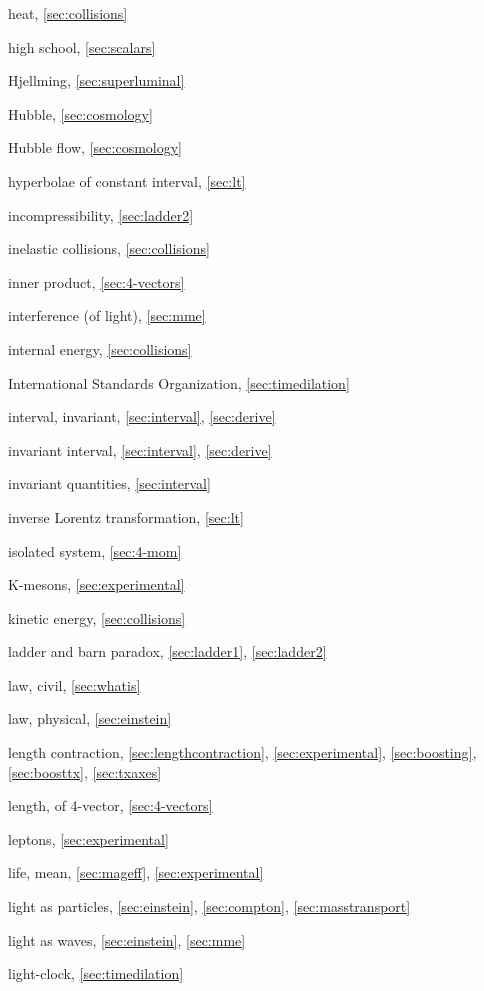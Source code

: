 \begin{theindex}
\item heat, \ref{sec:collisions}
\item high school, \ref{sec:scalars}
\item Hjellming, \ref{sec:superluminal}
\item Hubble, \ref{sec:cosmology}
\item Hubble flow, \ref{sec:cosmology}
\item hyperbolae of constant interval, \ref{sec:lt}
\item incompressibility, \ref{sec:ladder2}
\item inelastic collisions, \ref{sec:collisions}
\item inner product, \ref{sec:4-vectors}
\item interference (of light), \ref{sec:mme}
\item internal energy, \ref{sec:collisions}
\item International Standards Organization, \ref{sec:timedilation}
\item interval, invariant, \ref{sec:interval}, \ref{sec:derive}
\item invariant interval, \ref{sec:interval}, \ref{sec:derive}
\item invariant quantities, \ref{sec:interval}
\item inverse Lorentz transformation, \ref{sec:lt}
\item isolated system, \ref{sec:4-mom}
\item K-mesons, \ref{sec:experimental}
\item kinetic energy, \ref{sec:collisions}
\item ladder and barn paradox, \ref{sec:ladder1}, \ref{sec:ladder2}
\item law, civil, \ref{sec:whatis}
\item law, physical, \ref{sec:einstein}
\item length contraction, \ref{sec:lengthcontraction}, \ref{sec:experimental},
	\ref{sec:boosting}, \ref{sec:boosttx}, \ref{sec:txaxes}
\item length, of 4-vector, \ref{sec:4-vectors}
\item leptons, \ref{sec:experimental}
\item life, mean, \ref{sec:mageff}, \ref{sec:experimental}
\item light as particles, \ref{sec:einstein}, \ref{sec:compton},
	\ref{sec:masstransport}
\item light as waves, \ref{sec:einstein}, \ref{sec:mme}
\item light-clock, \ref{sec:timedilation}

\end{theindex}
